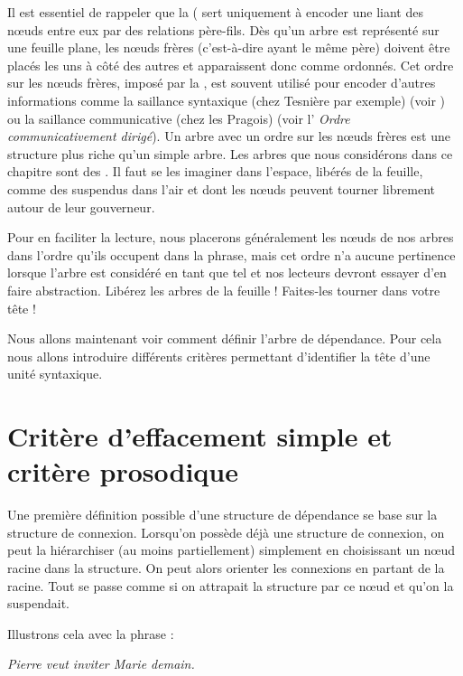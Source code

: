 Il est essentiel de rappeler que la  ( sert uniquement à encoder une  liant des nœuds entre eux par des relations père-fils. Dès qu’un arbre est représenté sur une feuille plane, les nœuds frères (c’est-à-dire ayant le même père) doivent être placés les uns à côté des autres et apparaissent donc comme ordonnés. Cet ordre sur les nœuds frères, imposé par la , est souvent utilisé pour encoder d'autres informations comme la saillance syntaxique (chez Tesnière par exemple) (voir ) ou la saillance communicative (chez les Pragois) (voir l' \textit{Ordre communicativement dirigé}). Un arbre avec un ordre sur les nœuds frères est une structure plus riche qu’un simple arbre. Les arbres que nous considérons dans ce chapitre sont des . Il faut se les imaginer dans l’espace, libérés de la feuille, comme des  suspendus dans l’air et dont les nœuds peuvent tourner librement autour de leur gouverneur.

Pour en faciliter la lecture, nous placerons généralement les nœuds de nos arbres dans l’ordre qu’ils occupent dans la phrase, mais cet ordre n’a aucune pertinence lorsque l’arbre est considéré en tant que tel et nos lecteurs devront essayer d’en faire abstraction. Libérez les arbres de la feuille ! Faites-les tourner dans votre tête !

Nous allons maintenant voir comment définir l’arbre de dépendance. Pour cela nous allons introduire différents critères permettant d’identifier la tête d’une unité syntaxique.

\section{Critère d’effacement simple et critère prosodique}\label{sec:3.3.7}

Une première définition possible d’une structure de dépendance se base sur la structure de connexion. Lorsqu’on possède déjà une structure de connexion, on peut la hiérarchiser (au moins partiellement) simplement en choisissant un nœud racine dans la structure. On peut alors orienter les connexions en partant de la racine. Tout se passe comme si on attrapait la structure par ce nœud et qu’on la suspendait.

Illustrons cela avec la phrase :

\ea \textit{Pierre veut inviter Marie demain.}\z


